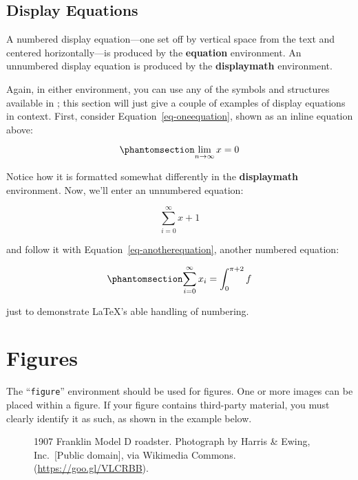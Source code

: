 \documentclass[manuscript,screen,review]{acmart}
\begin{document}
\subsection{Display Equations}\label{display-equations}

A numbered display equation---one set off by vertical space from the
text and centered horizontally---is produced by the \textbf{equation}
environment. An unnumbered display equation is produced by the
\textbf{displaymath} environment.

Again, in either environment, you can use any of the symbols and
structures available in \LaTeX@; this section will just give a couple of
examples of display equations in context. First, consider
Equation~\ref{eq-oneequation}, shown as an inline equation above:

\begin{equation}\phantomsection\label{eq-oneequation}{
\lim_{n\rightarrow \infty}x=0
}\end{equation}

Notice how it is formatted somewhat differently in the
\textbf{displaymath} environment. Now, we'll enter an unnumbered
equation:

\[\sum_{i=0}^{\infty} x + 1\]

and follow it with Equation~\ref{eq-anotherequation}, another numbered
equation:

\begin{equation}\phantomsection\label{eq-anotherequation}{
\sum_{i=0}^{\infty}x_i=\int_{0}^{\pi+2} f
}\end{equation}

just to demonstrate \LaTeX's able handling of numbering.

\section{Figures}\label{figures}

The ``\texttt{figure}'' environment should be used for figures. One or
more images can be placed within a figure. If your figure contains
third-party material, you must clearly identify it as such, as shown in
the example below.

\begin{figure}


\caption{\label{fig-dresses}1907 Franklin Model D roadster. Photograph
by Harris \& Ewing, Inc.~{[}Public domain{]}, via Wikimedia Commons.
(\url{https://goo.gl/VLCRBB}).}

\end{figure}%
\end{document}
